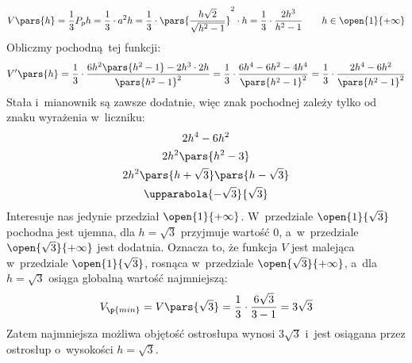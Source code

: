 \begin{equation*}
    V\pars{h}
        = \frac{1}{3}P_ph
        = \frac{1}{3} \cdot a^2h
        = \frac{1}{3} \cdot \pars{\frac{h\sqrt{2}}{\sqrt{h^2 - 1}}}^2 \cdot h
        = \frac{1}{3} \cdot \frac{2h^3}{h^2 - 1} \qquad h \in \open{1}{+\infty}
\end{equation*}
Obliczmy pochodną tej funkcji:
\begin{equation*}
    V'\pars{h}
        = \frac{1}{3} \cdot \frac{6h^2\pars{h^2 - 1} - 2h^3 \cdot 2h}{\pars{h^2 - 1}^2}
        = \frac{1}{3} \cdot \frac{6h^4 - 6h^2 - 4h^4}{\pars{h^2 - 1}^2}
        = \frac{1}{3} \cdot \frac{2h^4 - 6h^2}{\pars{h^2 - 1}^2}
\end{equation*}
Stała i~mianownik są zawsze dodatnie, więc znak pochodnej zależy tylko od znaku wyrażenia w~liczniku:
\begin{gather*}
    2h^4 - 6h^2\\
    2h^2\pars{h^2 - 3}\\
    2h^2\pars{h + \sqrt{3}}\pars{h - \sqrt{3}}\\
    \upparabola{-\sqrt{3}}{\sqrt{3}}
\end{gather*}
Interesuje nas jedynie przedział \(\open{1}{+\infty}\). W~przedziale \(\open{1}{\sqrt{3}}\) pochodna jest ujemna, dla \(h = \sqrt{3}\) przyjmuje wartość \(0\), a~w~przedziale \(\open{\sqrt{3}}{+\infty}\) jest dodatnia. Oznacza to, że funkcja \(V\) jest malejąca w~przedziale \(\open{1}{\sqrt{3}}\), rosnąca w~przedziale \(\open{\sqrt{3}}{+\infty}\), a~dla \(h = \sqrt{3}\) osiąga globalną wartość najmniejszą:
\begin{equation*}
    V_\p{min} = V\pars{\sqrt{3}} = \frac{1}{3} \cdot \frac{6\sqrt{3}}{3 - 1} = 3\sqrt{3}
\end{equation*}
Zatem najmniejsza możliwa objętość ostrosłupa wynosi \(3\sqrt{3}\) i~jest osiągana przez ostrosłup o~wysokości \(h = \sqrt{3}\).
